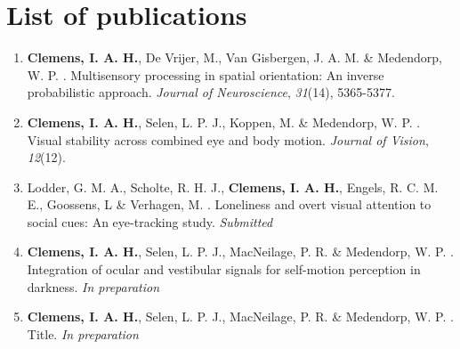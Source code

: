 \clearpage
\pagestyle{empty}

\chapter*{List of publications}
{}

\begin{enumerate}

\item \textbf{Clemens, I. A. H.}, De Vrijer, M., Van Gisbergen, J. A. M. \& Medendorp, W. P.
\citeyear{clemens2011}. Multisensory processing in spatial orientation: An inverse probabilistic approach. \textit{Journal of Neuroscience}, \textit{31}(14), 5365-5377.

\item \textbf{Clemens, I. A. H.}, Selen, L. P. J., Koppen, M. \& Medendorp, W. P. \citeyear{clemens2012}. Visual stability across combined eye and body motion. \textit{Journal of Vision}, \textit{12}(12).

\item Lodder, G. M. A., Scholte, R. H. J., \textbf{Clemens, I. A. H.}, Engels, R. C. M. E., Goossens, L \& Verhagen, M. \citeyear{lodder2015}. Loneliness and overt visual attention to social cues: An eye-tracking study. \textit{Submitted}

\item \textbf{Clemens, I. A. H.}, Selen, L. P. J., MacNeilage, P. R. \& Medendorp, W. P. \citeyear{clemens2015a}. Integration of ocular and vestibular signals for self-motion perception in darkness. \textit{In preparation}

\item \textbf{Clemens, I. A. H.}, Selen, L. P. J., MacNeilage, P. R. \& Medendorp, W. P. \citeyear{clemens2015b}. Title. \textit{In preparation}

\end{enumerate}

